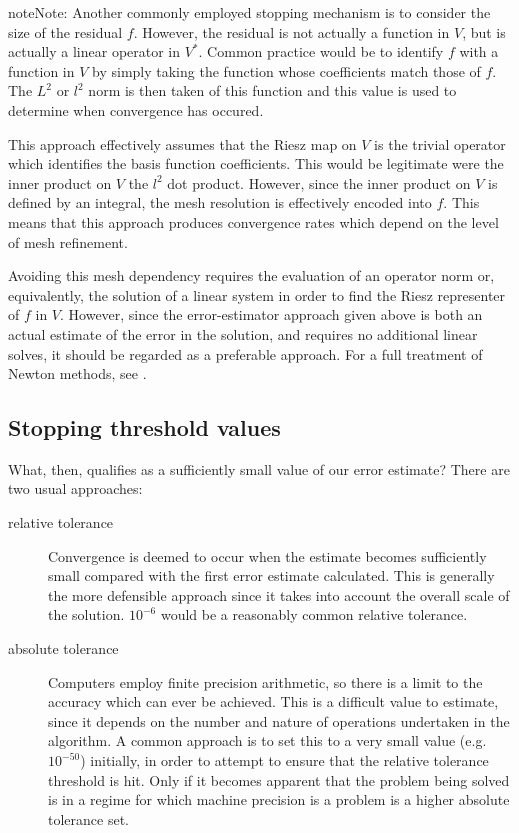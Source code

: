 \documentclass{book}
\begin{document}
\begin{sphinxadmonition}{note}{Note:}
Another commonly employed stopping mechanism is to consider the
size of the residual \(f\). However, the residual is not actually a
function in \(V\), but is actually a linear operator in \(V^*\). Common
practice would be to identify \(f\) with a function in \(V\) by simply
taking the function whose coefficients match those of \(f\). The
\(L^2\) or \(l^2\) norm is then taken of this function and this value
is used to determine when convergence has occured.

This approach effectively assumes that the Riesz map on \(V\) is the
trivial operator which identifies the basis function
coefficients. This would be legitimate were the inner product on
\(V\) the \(l^2\) dot product. However, since the inner product on \(V\)
is defined by an integral, the mesh resolution is effectively
encoded into \(f\). This means that this approach produces
convergence rates which depend on the level of mesh refinement.

Avoiding this mesh dependency requires the evaluation of an
operator norm or, equivalently, the solution of a linear system in
order to find the Riesz representer of \(f\) in \(V\). However, since
the error-estimator approach given above is both an actual estimate
of the error in the solution, and requires no additional linear
solves, it should be regarded as a preferable approach. For a full
treatment of Newton methods, see \label{\detokenize{8_nonlinear_problems:id1}}{\hyperref[\detokenize{zbibliography:deuflhard2011}]{\sphinxcrossref{{[}Deu11{]}}}}.
\end{sphinxadmonition}


\subsection{Stopping threshold values}
\label{\detokenize{8_nonlinear_problems:stopping-threshold-values}}
What, then, qualifies as a sufficiently small value of our error
estimate? There are two usual approaches:
\begin{description}
\item[{relative tolerance}] \leavevmode
Convergence is deemed to occur when the estimate
becomes sufficiently small compared with the first error estimate
calculated.  This is generally the more defensible approach since
it takes into account the overall scale of the solution. \(10^{-6}\)
would be a reasonably common relative tolerance.

\item[{absolute tolerance}] \leavevmode
Computers employ finite precision arithmetic, so there is a limit
to the accuracy which can ever be achieved. This is a difficult
value to estimate, since it depends on the number and nature of
operations undertaken in the algorithm. A common approach is to set
this to a very small value (e.g. \(10^{-50}\)) initially, in order to
attempt to ensure that the relative tolerance threshold is
hit. Only if it becomes apparent that the problem being solved is
in a regime for which machine precision is a problem is a higher
absolute tolerance set.

\end{description}
\end{document}
